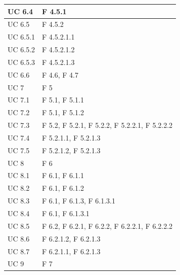 \documentclass[a4paper,11pt]{article}
\begin{document}
\begin{longtable}{p{}p{}}
\midrule
UC 6.4 & F 4.5.1\\
\midrule
UC 6.5 & F 4.5.2\\
\midrule
UC 6.5.1 & F 4.5.2.1.1\\
\midrule
UC 6.5.2 & F 4.5.2.1.2\\
\midrule
UC 6.5.3 & F 4.5.2.1.3\\
\midrule
UC 6.6 & F 4.6, F 4.7\\
\midrule
UC 7 & F 5\\
\midrule
UC 7.1 & F 5.1, F 5.1.1\\
\midrule
UC 7.2 & F 5.1, F 5.1.2\\
\midrule
UC 7.3 & F 5.2, F 5.2.1, F 5.2.2, F 5.2.2.1, F 5.2.2.2\\
\midrule
UC 7.4 & F 5.2.1.1, F 5.2.1.3\\
\midrule
UC 7.5 & F 5.2.1.2, F 5.2.1.3\\
\midrule
UC 8 & F 6\\
\midrule
UC 8.1 & F 6.1, F 6.1.1\\
\midrule
UC 8.2 & F 6.1, F 6.1.2\\
\midrule
UC 8.3 & F 6.1, F 6.1.3, F 6.1.3.1\\
\midrule
UC 8.4 & F 6.1, F 6.1.3.1\\
\midrule
UC 8.5 & F 6.2, F 6.2.1, F 6.2.2, F 6.2.2.1, F 6.2.2.2\\
\midrule
UC 8.6 & F 6.2.1.2, F 6.2.1.3\\
\midrule
UC 8.7 & F 6.2.1.1, F 6.2.1.3\\
\midrule
UC 9 & F 7\\
		
			
			\end{longtable}
\end{document}
